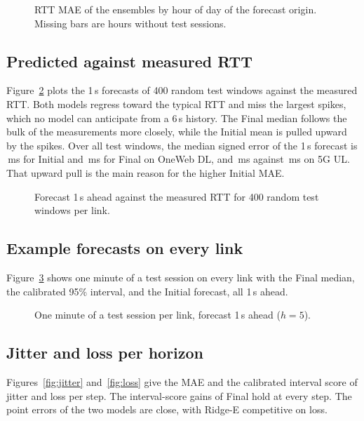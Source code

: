 \begin{figure}[h]
  \centering
  \resizebox{\linewidth}{!}{}
  \caption{RTT MAE of the ensembles by hour of day of the forecast origin. Missing bars are hours without test sessions.}
  \label{fig:hour}
\end{figure}

\subsection{Predicted against measured RTT}
Figure~\ref{fig:scatter} plots the 1\,s forecasts of 400 random test windows against the measured RTT. Both models regress toward the typical RTT and miss the largest spikes, which no model can anticipate from a 6\,s history. The Final median follows the bulk of the measurements more closely, while the Initial mean is pulled upward by the spikes. Over all test windows, the median signed error of the 1\,s forecast is \BiasPrevOWDL\,ms for Initial and \BiasFROWDL\,ms for Final on OneWeb DL, and \BiasPrevQUL\,ms against \BiasFRQUL\,ms on 5G UL. That upward pull is the main reason for the higher Initial MAE.

\begin{figure}[h]
  \centering
  \resizebox{\linewidth}{!}{}
  \caption{Forecast 1\,s ahead against the measured RTT for 400 random test windows per link.}
  \label{fig:scatter}
\end{figure}

\subsection{Example forecasts on every link}
Figure~\ref{fig:traces} shows one minute of a test session on every link with the Final median, the calibrated 95\% interval, and the Initial forecast, all 1\,s ahead.

\begin{figure}[p]
  \centering
  \resizebox{\linewidth}{!}{}
  \caption{One minute of a test session per link, forecast 1\,s ahead ($h=5$).}
  \label{fig:traces}
\end{figure}

\subsection{Jitter and loss per horizon}
Figures~\ref{fig:jitter} and~\ref{fig:loss} give the MAE and the calibrated interval score of jitter and loss per step. The interval-score gains of Final hold at every step. The point errors of the two models are close, with Ridge-E competitive on loss.

